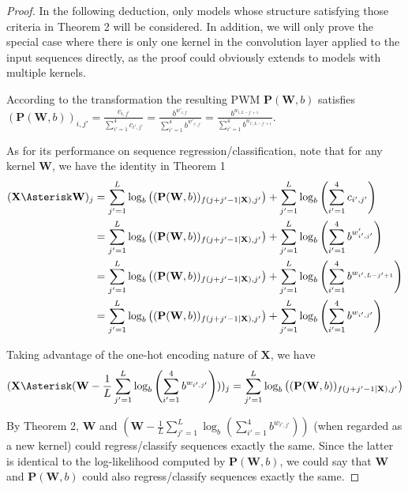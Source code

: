 \documentclass[12pt]{article}
\newcommand{\matrixSymbol}[1]{\mathbf{#1}}
\begin{document}
\begin{proof}
In the following deduction, only models whose structure satisfying those criteria in Theorem 2 will be considered. In addition, we will only prove the special case where there is only one kernel in the convolution layer applied to the input sequences directly, as the proof could obviously extends to models with multiple kernels.

According to the transformation the resulting PWM $\matrixSymbol{P}(\matrixSymbol{W}, b)$ satisfies $(\matrixSymbol{P}(\matrixSymbol{W}, b))_{i, j'} = \frac{c_{i, j'}} {\sum_{i'=1}^{4}{ c_{i', j'}}} = \frac{b^{w'_{i, j'}}} {\sum_{i'=1}^{4}{b^{w'_{i', j'}}}} = \frac{b^{w_{i, L-j'+1}}} {\sum_{i'=1}^{4}{b^{w_{i', L-j'+1}}}}$.

As for its performance on sequence regression/classification, note that for any kernel $\matrixSymbol{W}$, we have the identity in Theorem 1
\begin{align}
(\matrixSymbol{X} \Asterisk \matrixSymbol{W})_j & = \sum_{j'=1}^{L}{ \log_{b}\left( (\matrixSymbol{P}(\matrixSymbol{W}, b))_{f(j + j' - 1|\matrixSymbol{X}), j'} \right) } + \sum_{j'=1}^{L}{\log_{b} \left( \sum_{i'=1}^{4}{c_{i', j'}} \right)} \\ 
& = \sum_{j'=1}^{L}{ \log_{b}\left( (\matrixSymbol{P}(\matrixSymbol{W}, b))_{f(j + j' - 1|\matrixSymbol{X}), j'} \right) } + \sum_{j'=1}^{L}{\log_{b} \left( \sum_{i'=1}^{4}{b^{w'_{i', j'}}} \right) } \notag \\
& = \sum_{j'=1}^{L}{ \log_{b}\left( (\matrixSymbol{P}(\matrixSymbol{W}, b))_{f(j + j' - 1|\matrixSymbol{X}), j'} \right) } + \sum_{j'=1}^{L}{\log_{b} \left( \sum_{i'=1}^{4}{b^{w_{i', L-j'+1}}} \right) } \notag \\
& = \sum_{j'=1}^{L}{ \log_{b}\left( (\matrixSymbol{P}(\matrixSymbol{W}, b))_{f(j + j' - 1|\matrixSymbol{X}), j'} \right) } + \sum_{j'=1}^{L}{\log_{b} \left( \sum_{i'=1}^{4}{b^{w_{i', j'}}} \right) } \notag 
\end{align}


Taking advantage of the one-hot encoding nature of $\matrixSymbol{X}$, we have 
\begin{align}
(\matrixSymbol{X} \Asterisk (\matrixSymbol{W} - \frac{1}{L}\sum_{j'=1}^{L}{\log_{b} \left( \sum_{i'=1}^{4}{b^{w_{i', j'}}} \right)}))_j = \sum_{j'=1}^{L}{ \log_{b}\left( (\matrixSymbol{P}(\matrixSymbol{W}, b))_{f(j + j' - 1|\matrixSymbol{X}), j'} \right) }
\end{align}

By Theorem 2, $\matrixSymbol{W}$ and $(\matrixSymbol{W} - \frac{1}{L}\sum_{j'=1}^{L}{\log_{b} \left( \sum_{i'=1}^{4}{b^{w_{i', j'}}} \right)})$ (when regarded as a new kernel) could regress/classify sequences exactly the same. Since the latter is identical to the log-likelihood computed by $\matrixSymbol{P}(\matrixSymbol{W}, b)$, we could say that $\matrixSymbol{W}$ and  $\matrixSymbol{P}(\matrixSymbol{W}, b)$ could also regress/classify sequences exactly the same. 




\end{proof}
\end{document}
